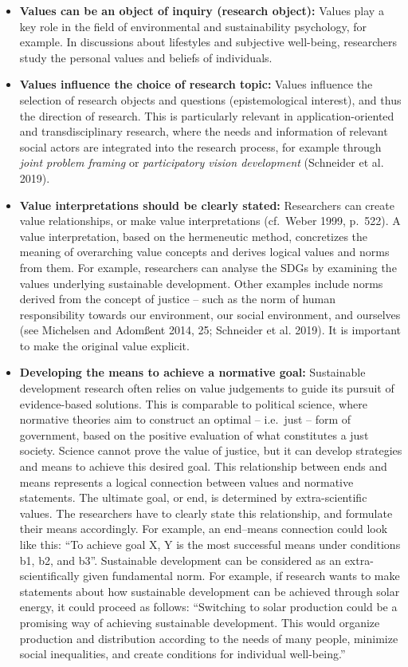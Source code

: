 \documentclass[
  a4paper,
  openany]{book}
\begin{document}
\begin{itemize}
\item
  \textbf{Values can be an object of inquiry (research object):} Values
  play a key role in the field of environmental and sustainability
  psychology, for example. In discussions about lifestyles and
  subjective well-being, researchers study the personal values and
  beliefs of individuals.
\item
  \textbf{Values influence the choice of research topic:} Values
  influence the selection of research objects and questions
  (epistemological interest), and thus the direction of research. This
  is particularly relevant in application-oriented and transdisciplinary
  research, where the needs and information of relevant social actors
  are integrated into the research process, for example through
  \emph{joint problem framing} or \emph{participatory vision
  development} (Schneider et al. 2019).
\item
  \textbf{Value interpretations should be clearly stated:} Researchers
  can create value relationships, or make value interpretations
  (cf.~Weber 1999, p.~522). A value interpretation, based on the
  hermeneutic method, concretizes the meaning of overarching value
  concepts and derives logical values and norms from them. For example,
  researchers can analyse the SDGs by examining the values underlying
  sustainable development. Other examples include norms derived from the
  concept of justice -- such as the norm of human responsibility towards
  our environment, our social environment, and ourselves (see Michelsen
  and Adomßent 2014, 25; Schneider et al. 2019). It is important to make
  the original value explicit.
\item
  \textbf{Developing the means to achieve a normative goal:} Sustainable
  development research often relies on value judgements to guide its
  pursuit of evidence-based solutions. This is comparable to political
  science, where normative theories aim to construct an optimal --
  i.e.~just -- form of government, based on the positive evaluation of
  what constitutes a just society. Science cannot prove the value of
  justice, but it can develop strategies and means to achieve this
  desired goal. This relationship between ends and means represents a
  logical connection between values and normative statements. The
  ultimate goal, or end, is determined by extra-scientific values. The
  researchers have to clearly state this relationship, and formulate
  their means accordingly. For example, an end--means connection could
  look like this: ``To achieve goal X, Y is the most successful means
  under conditions b1, b2, and b3''. Sustainable development can be
  considered as an extra-scientifically given fundamental norm. For
  example, if research wants to make statements about how sustainable
  development can be achieved through solar energy, it could proceed as
  follows: ``Switching to solar production could be a promising way of
  achieving sustainable development. This would organize production and
  distribution according to the needs of many people, minimize social
  inequalities, and create conditions for individual well-being.''
\end{itemize}
\end{document}
